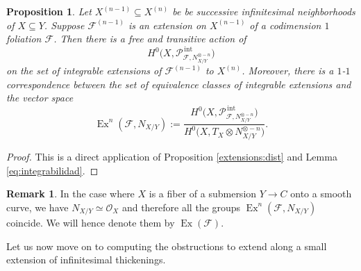 \documentclass[reqno]{amsart}
\theoremstyle{plain}
\newcommand{\OO}{\mathcal{O}}
\newcommand{\F}{\mathscr{F}}
\newcommand{\PP}{\mathcal{P}}
\DeclareMathOperator{\Ex}{Ex}
\DeclareMathOperator{\Int}{int}
\newtheorem{proposition}[theorem]{Proposition}
\theoremstyle{definition}
\newtheorem{remark}[theorem]{Remark}
\theoremstyle{named}
\begin{document}
\begin{proposition} \label{def:fol}Let $X^{(n-1)}\subseteq X^{(n)}$ be be successive infinitesimal neighborhoods of $X\subseteq Y$. Suppose $\F^{(n-1)}$ is an extension on $X^{(n-1)}$ of a codimension $1$ foliation $\F$. Then there is a free and transitive action of
\[
H^0\big(X,\PP_{\F,N_{X/Y}^{\otimes - n}}^{\,\Int}\big)
\]
on the set of integrable extensions of $\F^{(n-1)}$ to $X^{(n)}$.
Moreover, there is a $1$-$1$ correspondence between the set of equivalence classes of integrable extensions and the vector space 
$$\Ex^n(\F,N_{X/Y}) := \frac{H^0\Big(X,\PP_{\F,N_{X/Y}^{\otimes - n}}^{\,\Int}\Big)}{H^0\big(X,T_X\otimes N_{X/Y}^{\otimes -n}\big)}.$$ 
\end{proposition}
\begin{proof}
This is a direct application of Proposition \ref{extensions:dist} and Lemma \ref{eq:integrabilidad}.
\end{proof}

\begin{remark}
    In the case where $X$ is a fiber of a submersion $Y\rightarrow C$ onto a smooth curve, we have $N_{X/Y}\simeq \OO_X$ and therefore all the groups $\Ex^n(\F,N_{X/Y})$ coincide. We will hence denote them by $\Ex(\F)$. 
\end{remark}

Let us now move on to computing the obstructions to extend along a small extension of infinitesimal thickenings.
\end{document}
